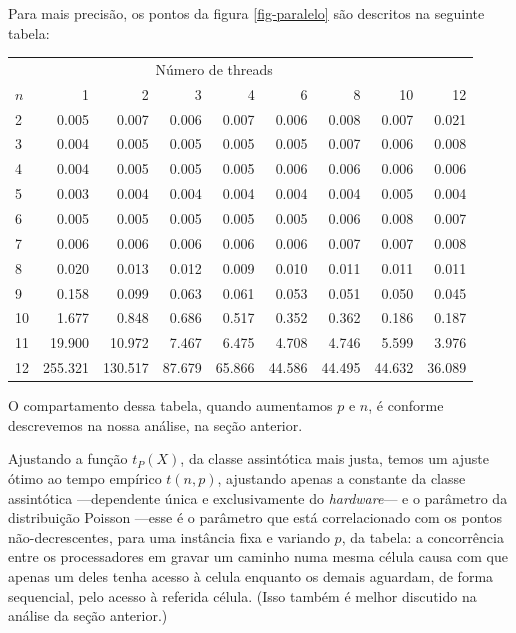 \documentclass[a4paper,article,10pt]{article}
\begin{document}
    Para mais precisão, os pontos da figura \ref{fig-paralelo} são descritos na
    seguinte tabela:

    \begin{tabular}{lrrrrrrrr}
      \toprule
      \multicolumn{8}{c}{Número de threads} \\
      \cmidrule(r){2-9}
      $n$ & 1 & 2 & 3 & 4 & 6 & 8 & 10 & 12 \\
      \midrule
      2  & 0.005 & 0.007 & 0.006 & 0.007 & 0.006 & 0.008 & 0.007 & 0.021 \\
      3  & 0.004 & 0.005 & 0.005 & 0.005 & 0.005 & 0.007 & 0.006 & 0.008 \\
      4  & 0.004 & 0.005 & 0.005 & 0.005 & 0.006 & 0.006 & 0.006 & 0.006 \\
      5  & 0.003 & 0.004 & 0.004 & 0.004 & 0.004 & 0.004 & 0.005 & 0.004 \\
      6  & 0.005 & 0.005 & 0.005 & 0.005 & 0.005 & 0.006 & 0.008 & 0.007 \\
      7  & 0.006 & 0.006 & 0.006 & 0.006 & 0.006 & 0.007 & 0.007 & 0.008 \\
      8  & 0.020 & 0.013 & 0.012 & 0.009 & 0.010 & 0.011 & 0.011 & 0.011 \\
      9  & 0.158 & 0.099 & 0.063 & 0.061 & 0.053 & 0.051 & 0.050 & 0.045 \\
      10 & 1.677 & 0.848 & 0.686 & 0.517 & 0.352 & 0.362 & 0.186 & 0.187 \\
      11 & 19.900 & 10.972 & 7.467 & 6.475 & 4.708 & 4.746 & 5.599 & 3.976 \\
      12 & 255.321 & 130.517 & 87.679 & 65.866 & 44.586 & 44.495 & 44.632 &
      36.089 \\
      \bottomrule
    \end{tabular}
    
    O compartamento dessa tabela, quando aumentamos $p$ e $n$, é conforme
    descrevemos na nossa análise, na seção anterior.

    Ajustando a função $t_P(X)$, da classe assintótica mais justa, temos um
    ajuste ótimo ao tempo empírico $t(n, p)$, ajustando apenas a constante da
    classe assintótica ---dependente única e exclusivamente do
    \emph{hardware}--- e o parâmetro da distribuição Poisson ---esse é o
    parâmetro que está correlacionado com os pontos não-decrescentes, para uma
    instância fixa e variando $p$, da tabela: a concorrência entre os
    processadores em gravar um caminho numa mesma célula causa com que apenas um
    deles tenha acesso à celula enquanto os demais aguardam, de forma
    sequencial, pelo acesso à referida célula. (Isso também é melhor discutido
    na análise da seção anterior.)
\end{document}
